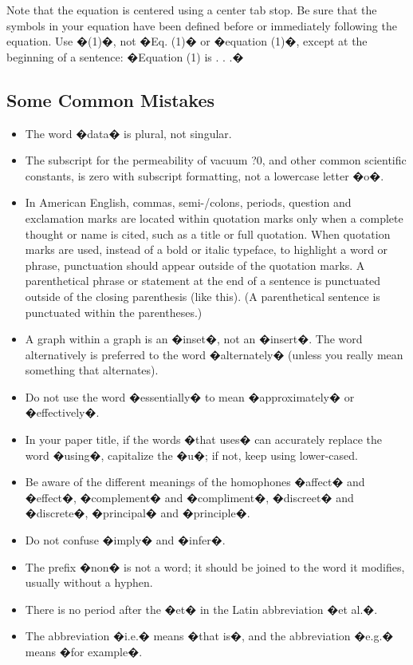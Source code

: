 \documentclass[letterpaper, 10 pt, conference]{ieeeconf}  %
\begin{document}
{{Note that the equation is centered using a center tab stop. Be sure that the symbols in your equation have been defined before or immediately following the equation. Use �(1)�, not �Eq. (1)� or �equation (1)�, except at the beginning of a sentence: �Equation (1) is . . .�

\subsection{Some Common Mistakes}
\begin{itemize}


\item The word �data� is plural, not singular.
\item The subscript for the permeability of vacuum ?0, and other common scientific constants, is zero with subscript formatting, not a lowercase letter �o�.
\item In American English, commas, semi-/colons, periods, question and exclamation marks are located within quotation marks only when a complete thought or name is cited, such as a title or full quotation. When quotation marks are used, instead of a bold or italic typeface, to highlight a word or phrase, punctuation should appear outside of the quotation marks. A parenthetical phrase or statement at the end of a sentence is punctuated outside of the closing parenthesis (like this). (A parenthetical sentence is punctuated within the parentheses.)
\item A graph within a graph is an �inset�, not an �insert�. The word alternatively is preferred to the word �alternately� (unless you really mean something that alternates).
\item Do not use the word �essentially� to mean �approximately� or �effectively�.
\item In your paper title, if the words �that uses� can accurately replace the word �using�, capitalize the �u�; if not, keep using lower-cased.
\item Be aware of the different meanings of the homophones �affect� and �effect�, �complement� and �compliment�, �discreet� and �discrete�, �principal� and �principle�.
\item Do not confuse �imply� and �infer�.
\item The prefix �non� is not a word; it should be joined to the word it modifies, usually without a hyphen.
\item There is no period after the �et� in the Latin abbreviation �et al.�.
\item The abbreviation �i.e.� means �that is�, and the abbreviation �e.g.� means �for example�.


\end{itemize}}}
\end{document}
